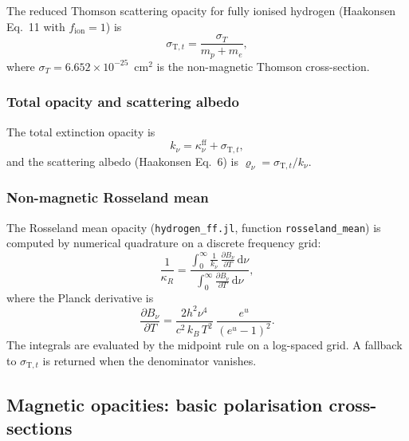 \noindent
The reduced Thomson scattering opacity for fully ionised hydrogen
(Haakonsen Eq.~11 with $f_{\mathrm{ion}}=1$) is
%
\begin{equation}
\label{eq:sigma_thomson_nonmag}
\sigma_{\mathrm{T},t} = \frac{\sigma_T}{m_p+m_e},
\end{equation}
%
where $\sigma_T = 6.652\times10^{-25}$~cm$^2$ is the non-magnetic Thomson
cross-section.

\subsubsection{Total opacity and scattering albedo}
\label{sec:opacity:nonmag:total}

\noindent
The total extinction opacity is
%
\begin{equation}
\label{eq:k_total_nonmag}
k_\nu = \kappa_\nu^{\mathrm{ff}} + \sigma_{\mathrm{T},t},
\end{equation}
%
and the scattering albedo (Haakonsen Eq.~6) is
$\varrho_\nu = \sigma_{\mathrm{T},t}/k_\nu$.

\subsubsection{Non-magnetic Rosseland mean}
\label{sec:opacity:nonmag:ross}

\noindent
The Rosseland mean opacity (\texttt{hydrogen\_ff.jl}, function
\texttt{rosseland\_mean}) is computed by numerical quadrature on a
discrete frequency grid:
%
\begin{equation}
\label{eq:ross_nonmag}
\frac{1}{\kappa_R}
  = \frac{\displaystyle\int_0^\infty
      \frac{1}{k_\nu}\,\frac{\partial B_\nu}{\partial T}\,\mathrm{d}\nu}
    {\displaystyle\int_0^\infty
      \frac{\partial B_\nu}{\partial T}\,\mathrm{d}\nu},
\end{equation}
%
where the Planck derivative is
%
\begin{equation}
\label{eq:dBdT}
\frac{\partial B_\nu}{\partial T}
  = \frac{2h^2\nu^4}{c^2\,k_B\,T^2}\;\frac{e^u}{(e^u - 1)^2}.
\end{equation}
%
The integrals are evaluated by the midpoint rule on a log-spaced grid.
A fallback to $\sigma_{\mathrm{T},t}$ is returned when the denominator
vanishes.


\subsection{Magnetic opacities: basic polarisation cross-sections}
\label{sec:opacity:mag:basic}

